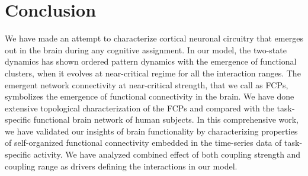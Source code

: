 \documentclass[preprintnumbers,amsmath,amssymb,onecolumn]{revtex4}
\begin{document}
\section{Conclusion}

We have made an attempt to characterize cortical neuronal circuitry that emerges out in the brain during any cognitive assignment. In our model, the two-state dynamics has shown ordered pattern dynamics with the emergence of functional clusters, when it evolves at near-critical regime for all the interaction ranges. The emergent network connectivity at near-critical strength, that we call as FCPs, symbolizes the emergence of functional connectivity in the brain. We have done extensive topological characterization of the FCPs and compared with the task-specific functional brain network of human subjects. In this comprehensive work, we have validated our insights of brain functionality by characterizing properties of self-organized functional connectivity embedded in the time-series data of task-specific activity. We have analyzed combined effect of both coupling strength and coupling range as drivers defining the interactions in our model. 
\end{document}
